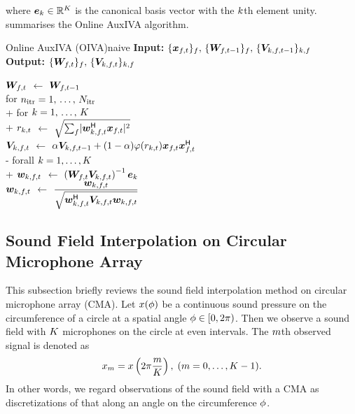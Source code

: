 \documentclass[sip,biber]{now-journal}
\begin{document}
where $\bm{e} _{k} \in \mathbb{R} ^{K}$ is the canonical basis vector with the $k$th element unity.
 summarises the Online AuxIVA algorithm.
\begin{algorithm}{Online AuxIVA (OIVA)}{naive}
  \textbf{Input:} $\{\Obs _{\ft}\} _{\freq},\, \{\Demix _{\ft[-1]}\}_{\freq},\, \{\cov _{\src,\ft[-1]}\}_{\src,\freq}$\\
  \textbf{Output:} $\{\Demix _{\ft}\}_{\freq},\, \{\cov _{\src,\ft}\}_{\src,\freq}$
  \begin{pseudo}
    {$\Demix _{\ft}$} $\gets$ $\Demix _{\ft[-1]}$ \ct{$(\forall \freq)$} \\
    for $n _{\mathrm{itr}} = 1,\, \dots,\, N _{\mathrm{itr}}$ \\+
      for $k = 1,\, \dots,\, K$ \\+
        {$r _{k,t}$} $\gets$ $\sqrt{\sum _{\freq} \abs{\demix _{\src,\ft} ^{\hermite} \Obs _{\ft}} ^2}$ \\
        {$\cov _{\src,\ft}    $} $\gets$ $\forget \cov _{\src,\ft[-1]} + (1 - \forget) \weight(\var _{\src,\tframe}) \Obs _{\ft} \Obs _{\ft} ^{\hermite}$ \ct{$(\forall \freq)$}\\-
      forall $k = 1, \dots, K$ \\+
        {$\demix _{\src,\ft}$} $\gets$ $\left(\Demix _{\ft} \cov _{\src,\ft}\right) ^{-1} \eye _{\src}$ \ct{$(\forall \freq)$}\\
        {$\demix _{\src,\ft}$} $\gets$ $\dfrac{\demix _{\src,\ft}}{\sqrt{\demix _{\src,\ft} ^{\hermite} \cov _{\src,\ft} \demix _{\src,\ft}}}$ \ct{$(\forall \freq)$}
  \end{pseudo}
\end{algorithm}

\subsection{Sound Field Interpolation on Circular Microphone Array}
This subsection briefly reviews the sound field interpolation method on circular microphone array (CMA).
Let $x (\phi)$ be a continuous sound pressure on the circumference of a circle at a spatial angle $\rotCoor \in \interval[open right,soft open fences]{0}{2\pi}$.
Then we observe a sound field with $K$ microphones on the circle at even intervals.
The $m$th observed signal is denoted as
\begin{equation}
  \sfcma _{\mic} = \sfcma \left(2\pi \frac{\mic}{\Mic}\right),\; (\mic = 0, \dots, \Mic - 1).%
  \label{eq:sfi:model}
\end{equation}
In other words, we regard observations of the sound field with a CMA as discretizations of that along an angle on the circumference $\phi$.
\end{document}
